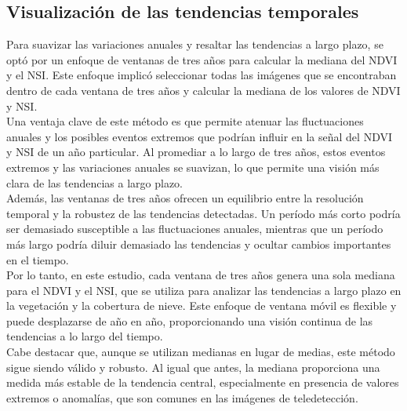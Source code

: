 {\small
\subsection{\textbf{Visualización de las tendencias temporales}}
Para suavizar las variaciones anuales y resaltar las tendencias a largo plazo, se optó por un enfoque de ventanas de tres años para calcular la mediana del NDVI y el NSI. Este enfoque implicó seleccionar todas las imágenes que se encontraban dentro de cada ventana de tres años y calcular la mediana de los valores de NDVI y NSI.\\

Una ventaja clave de este método es que permite atenuar las fluctuaciones anuales y los posibles eventos extremos que podrían influir en la señal del NDVI y NSI de un año particular. Al promediar a lo largo de tres años, estos eventos extremos y las variaciones anuales se suavizan, lo que permite una visión más clara de las tendencias a largo plazo.\\

Además, las ventanas de tres años ofrecen un equilibrio entre la resolución temporal y la robustez de las tendencias detectadas. Un período más corto podría ser demasiado susceptible a las fluctuaciones anuales, mientras que un período más largo podría diluir demasiado las tendencias y ocultar cambios importantes en el tiempo.\\

Por lo tanto, en este estudio, cada ventana de tres años genera una sola mediana para el NDVI y el NSI, que se utiliza para analizar las tendencias a largo plazo en la vegetación y la cobertura de nieve. Este enfoque de ventana móvil es flexible y puede desplazarse de año en año, proporcionando una visión continua de las tendencias a lo largo del tiempo.\\

Cabe destacar que, aunque se utilizan medianas en lugar de medias, este método sigue siendo válido y robusto. Al igual que antes, la mediana proporciona una medida más estable de la tendencia central, especialmente en presencia de valores extremos o anomalías, que son comunes en las imágenes de teledetección.\\
}